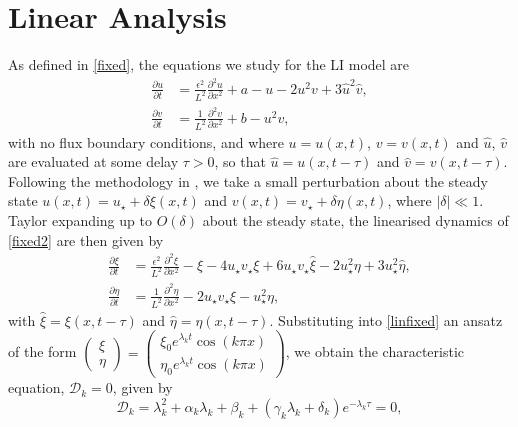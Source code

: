 \section{Linear Analysis}
As defined in \eqref{fixed}, the equations we study for the LI model are
\begin{equation}\label{fixed2}
  \begin{split}
  \frac{\partial u}{\partial t}&=\frac{\epsilon^2}{L^2}\frac{\partial^2u}{\partial x^2}+a-u-2u^2v+3\hat{u}^2\hat{v},\\
  \frac{\partial v}{\partial t}&=\frac{1}{L^2}\frac{\partial^2v}{\partial x^2}+b-u^2v,
\end{split}
\end{equation}
with no flux boundary conditions, and where $u=u(x,t)$, $v=v(x,t)$ and $\hat{u}$, $\hat{v}$ are evaluated at some delay $\tau>0$, so that $\hat{u}=u(x,t-\tau)$ and $\hat{v}=v(x,t-\tau)$. Following the methodology in \cite{yigaffneyli}, we take a small perturbation about the steady state $u(x,t)=u_\star+\delta\xi(x,t)$ and $v(x,t)=v_\star+\delta\eta(x,t)$, where $|\delta|\ll 1$. Taylor expanding up to $O(\delta)$ about the steady state, the linearised dynamics of \eqref{fixed2} are then given by
\begin{equation}\label{linfixed}
  \begin{split}
\frac{\partial\xi}{\partial t}&=\frac{\epsilon^2}{L^2}\frac{\partial^2\xi}{\partial x^2}-\xi-4u_\star v_\star\xi+6u_\star v_\star\hat{\xi}-2u_\star^2\eta+3u_\star^2\hat{\eta},\\
\frac{\partial\eta}{\partial t}&=\frac{1}{L^2}\frac{\partial^2\eta}{\partial x^2}-2u_\star v_\star\xi-u_\star^2\eta,
\end{split}
\end{equation}
with $\hat{\xi}=\xi(x,t-\tau)$ and $\hat{\eta}=\eta(x,t-\tau)$. Substituting into \eqref{linfixed} an ansatz of the form $\begin{pmatrix}\xi\\\eta\end{pmatrix}=\begin{pmatrix}\xi_0e^{\lambda_k t}\cos(k\pi x)\\ \eta_0e^{\lambda_k t}\cos(k\pi x)\end{pmatrix}$, we obtain the characteristic equation, $\mathcal{D}_k=0$, given by
\begin{equation}\label{characfix}
\mathcal{D}_k=\lambda_k^2+\alpha_k\lambda_k+\beta_k+(\gamma_k\lambda_k+\delta_k)e^{-\lambda_k\tau}=0,
\end{equation}
